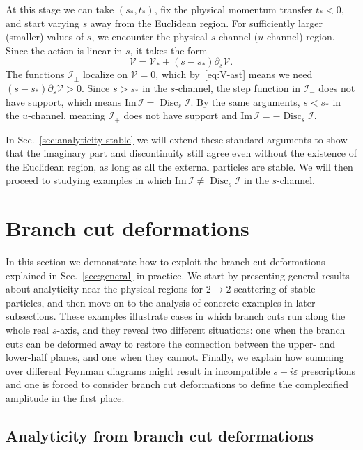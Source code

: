 \documentclass[12pt]{article}
\numberwithin{figure}{section}
\DeclareMathOperator{\Disc}{Disc}
\def \be {\begin{equation}}
\def \ee {\end{equation}}
\def \V {\mathcal{V}}
\def \I {\mathcal{I}}
\def \Im {\mathrm{Im}}
\begin{document}
	At this stage we can take $(s_\ast, t_\ast)$, fix the physical momentum transfer $t_\ast<0$, and start varying $s$ away from the Euclidean region. For sufficiently larger (smaller) values of $s$, we encounter the physical $s$-channel ($u$-channel) region. Since the action is linear in $s$, it takes the form
	\be
	\V = \V_\ast + (s-s_\ast) \partial_s \V.
	\ee
	The functions $\I_\pm$ localize on $\V=0$, which by~\eqref{eq:V-ast} means we need $(s-s_\ast)\partial_s \V > 0$. Since $s>s_\ast$ in the $s$-channel, the step function in $\I_-$ does not have support, which means $\Im\, \I = \Disc_s \I$. By the same arguments, $s<s_\ast$ in the $u$-channel, meaning $\I_+$ does not have support and $\Im\, \I = - \Disc_s \I$.
	
	In Sec.~\ref{sec:analyticity-stable} we will extend these standard arguments to show that the imaginary part and discontinuity still agree even without the existence of the Euclidean region, as long as all the external particles are stable. We will then proceed to studying examples in which $\Im\, \I \neq \Disc_s \I$ in the $s$-channel.
	
	
	
	
	\newpage
	\section{\label{sec:branch-cut-deformations}Branch cut deformations}
	
    In this section we demonstrate how to exploit the branch cut deformations explained in Sec.~\ref{sec:general} in practice. We start by presenting general results about analyticity near the physical regions for $2\to2$ scattering of stable particles, and then move on to the analysis of concrete examples in later subsections. These examples illustrate cases in which branch cuts run along the whole real $s$-axis, and they reveal two different situations: one when the branch cuts can be deformed away to restore the connection between the upper- and lower-half planes, and one when they cannot. Finally, we explain how summing over different Feynman diagrams might result in incompatible $s \pm i\varepsilon$ prescriptions and one is forced to consider branch cut deformations to define the complexified amplitude in the first place.
	
	\subsection{\label{sec:analyticity-stable}Analyticity from branch cut deformations}
	
\end{document}
